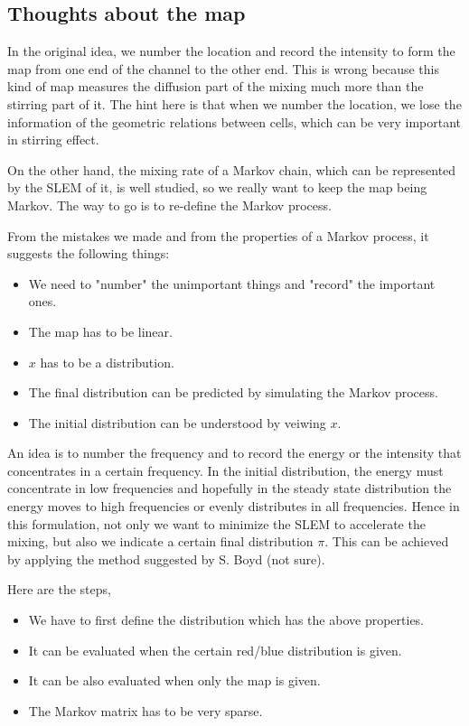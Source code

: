 \subsection{Thoughts about the map}
In the original idea, we number the location and record the intensity to form the map from one end of the channel to the other end. This is wrong because this kind of map measures the diffusion part of the mixing much more than the stirring part of it. The hint here is that when we number the location, we lose the information of the geometric relations between cells, which can be very important in stirring effect.

On the other hand, the mixing rate of a Markov chain, which can be represented by the SLEM of it, is well studied, so we really want to keep the map being Markov. The way to go is to re-define the Markov process.

From the mistakes we made and from the properties of a Markov process, it suggests the following things: 

\begin{itemize}
\item We need to "number" the unimportant things and "record" the important ones.    
\item The map has to be linear.
\item $x$ has to be a distribution.
\item The final distribution can be predicted by simulating the Markov process.
\item The initial distribution can be understood by veiwing $x$.
\end{itemize} 

An idea is to number the frequency and to record the energy or the intensity that concentrates in a certain frequency. In the initial distribution, the energy must concentrate in low frequencies and hopefully in the steady state distribution the energy moves to high frequencies or evenly distributes in all frequencies. 
Hence in this formulation, not only we want to minimize the SLEM to accelerate the mixing, but also we indicate a certain final distribution $\pi$. This can be achieved by applying the method suggested by S. Boyd (not sure).
 
Here are the steps,
\begin{itemize}
\item We have to first define the distribution which has the above properties.
\item It can be evaluated when the certain red/blue distribution is given.
\item It can be also evaluated when only the map is given. 
\item The Markov matrix has to be very sparse. 
\end{itemize} 

